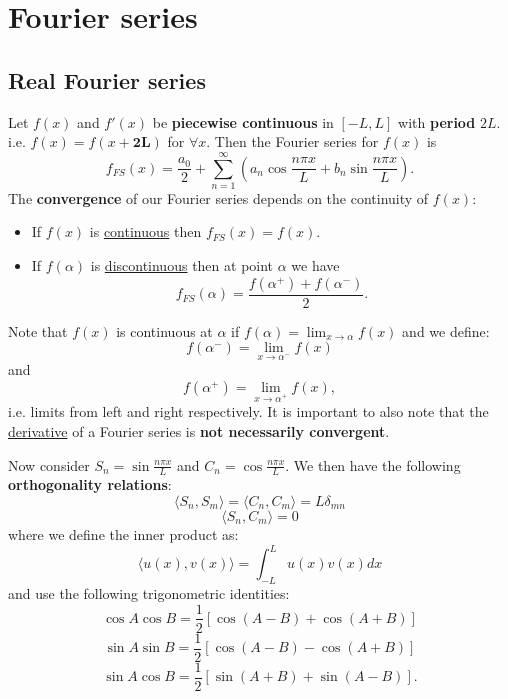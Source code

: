 \documentclass{article}
\begin{document}
\newpage

\section{Fourier series}

\subsection{Real Fourier series}
Let $f(x)$ and $f'(x)$ be \textbf{piecewise continuous} in $[-L, L]$ with \textbf{period} $2L$. \\
i.e. $f(x)=f(x+\boldsymbol{2L})$ for $\forall x$. Then the Fourier series for $f(x)$ is
$$f_{FS}(x)=\frac{a_0}{2}+\sum_{n=1}^{\infty}(a_n \cos\frac{n\pi x}{L}+b_n \sin\frac{n\pi x}{L}).$$
The \textbf{convergence} of our Fourier series depends on the continuity of $f(x)$:
\begin{itemize}
    \item If $f(x)$ is \underline{continuous} then $f_{FS}(x)=f(x)$.
    \item If $f(\alpha)$ is \underline{discontinuous} then at point $\alpha$ we have
    $$f_{FS}(\alpha)=\frac{f(\alpha^{+})+f(\alpha^{-})}{2}.$$
\end{itemize} 
Note that $f(x)$ is continuous at $\alpha$ if $f(\alpha)=\displaystyle\lim_{x\rightarrow\alpha}f(x)$ and we define:
$$f(\alpha^-)=\displaystyle\lim_{x\rightarrow\alpha^-}f(x)$$ and
$$f(\alpha^+)=\displaystyle\lim_{x\rightarrow\alpha^+}f(x),$$
i.e. limits from left and right respectively. It is important to also note that the \underline{derivative} of a Fourier series is \textbf{not necessarily convergent}.
    
Now consider $S_n = \sin\frac{n\pi x}{L}$ and $C_n = \cos\frac{n\pi x}{L}$. We then have the following \textbf{orthogonality relations}:
$$\langle S_n, S_m \rangle=\langle C_n, C_m \rangle=L\delta_{mn}$$
$$\langle S_n, C_m \rangle=0$$
where we define the inner product as:
$$\langle u(x), v(x) \rangle=\int_{-L}^{L} u(x)v(x)dx$$
and use the following trigonometric identities:
$$\cos A\cos B = \frac{1}{2}[\cos(A-B)+\cos(A+B)]$$
$$\sin A\sin B = \frac{1}{2}[\cos(A-B)-\cos(A+B)]$$
$$\sin A\cos B = \frac{1}{2}[\sin(A+B)+\sin(A-B)].$$

\newpage
\end{document}
